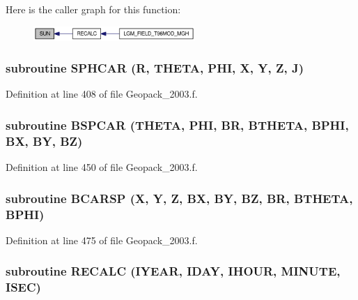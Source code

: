 Here is the caller graph for this function:\nopagebreak
\begin{figure}[H]
\begin{center}
\leavevmode
\includegraphics[width=174pt]{_geopack__2003_8f_59da55e19c09037b70bd65ec97a3567a_icgraph}
\end{center}
\end{figure}
\hypertarget{_geopack__2003_8f_51cbeafec4591bc974f865375cec3975}{
\subsubsection[{SPHCAR}]{\setlength{\rightskip}{0pt plus 5cm}subroutine SPHCAR (R, \/  THETA, \/  PHI, \/  X, \/  Y, \/  Z, \/  J)}}
\label{_geopack__2003_8f_51cbeafec4591bc974f865375cec3975}




Definition at line 408 of file Geopack\_\-2003.f.\hypertarget{_geopack__2003_8f_39f847a454b8691795bb0b0421de3a70}{
\subsubsection[{BSPCAR}]{\setlength{\rightskip}{0pt plus 5cm}subroutine BSPCAR (THETA, \/  PHI, \/  BR, \/  BTHETA, \/  BPHI, \/  BX, \/  BY, \/  BZ)}}
\label{_geopack__2003_8f_39f847a454b8691795bb0b0421de3a70}




Definition at line 450 of file Geopack\_\-2003.f.\hypertarget{_geopack__2003_8f_96aa3aaadaaa8312679747d9c48e3b51}{
\subsubsection[{BCARSP}]{\setlength{\rightskip}{0pt plus 5cm}subroutine BCARSP (X, \/  Y, \/  Z, \/  BX, \/  BY, \/  BZ, \/  BR, \/  BTHETA, \/  BPHI)}}
\label{_geopack__2003_8f_96aa3aaadaaa8312679747d9c48e3b51}




Definition at line 475 of file Geopack\_\-2003.f.\hypertarget{_geopack__2003_8f_57fa81f55e16b42ac170dbf64e99a5b4}{
\subsubsection[{RECALC}]{\setlength{\rightskip}{0pt plus 5cm}subroutine RECALC (IYEAR, \/  IDAY, \/  IHOUR, \/  MINUTE, \/  ISEC)}}
\label{_geopack__2003_8f_57fa81f55e16b42ac170dbf64e99a5b4}




